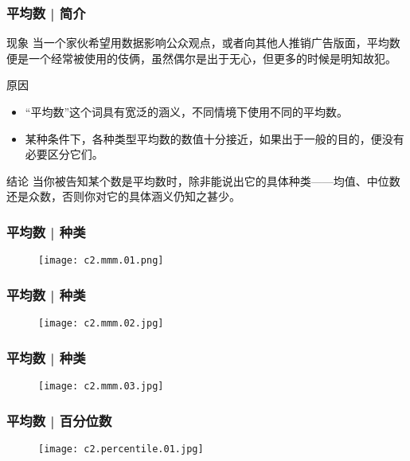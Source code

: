 \begin{frame}
  \frametitle{平均数 | 简介}
  \begin{block}{现象}
    当一个家伙希望用数据影响公众观点，或者向其他人推销广告版面，平均数便是一个经常被使用的伎俩，虽然偶尔是出于无心，但更多的时候是明知故犯。
  \end{block}
  \pause
  \begin{block}{原因}
    \begin{itemize}
      \item “平均数”这个词具有宽泛的涵义，不同情境下使用不同的平均数。
      \item 某种条件下，各种类型平均数的数值十分接近，如果出于一般的目的，便没有必要区分它们。
    \end{itemize}
  \end{block}
  \pause
  \begin{block}{\alert{结论}}
    当你被告知某个数是平均数时，除非能说出它的具体种类——均值、中位数还是众数，否则你对它的具体涵义仍知之甚少。
  \end{block}
\end{frame}

\begin{frame}
  \frametitle{平均数 | 种类}
  \begin{figure}
    \centering
    \texttt{[image: c2.mmm.01.png]}
  \end{figure}
\end{frame}

\begin{frame}
  \frametitle{平均数 | 种类}
  \begin{figure}
    \centering
    \texttt{[image: c2.mmm.02.jpg]}
  \end{figure}
\end{frame}

\begin{frame}
  \frametitle{平均数 | 种类}
  \begin{figure}
    \centering
    \texttt{[image: c2.mmm.03.jpg]}
  \end{figure}
\end{frame}

\begin{frame}
  \frametitle{平均数 | 百分位数}
  \begin{figure}
    \centering
    \texttt{[image: c2.percentile.01.jpg]}
  \end{figure}
\end{frame}

